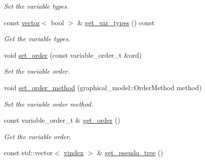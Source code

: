 \begin{DoxyCompactItemize}
\begin{DoxyCompactList}\small\item\em Set the variable types. \end{DoxyCompactList}\item 
const \hyperlink{classmerlin_1_1vector}{vector}$<$ bool $>$ \& \hyperlink{classmerlin_1_1wmb_a6bd57e3e3351407403d7cdf619ea286b}{get\+\_\+var\+\_\+types} () const \hypertarget{classmerlin_1_1wmb_a6bd57e3e3351407403d7cdf619ea286b}{}\label{classmerlin_1_1wmb_a6bd57e3e3351407403d7cdf619ea286b}

\begin{DoxyCompactList}\small\item\em Get the variable types. \end{DoxyCompactList}\item 
void \hyperlink{classmerlin_1_1wmb_aa16d549dcec0debda59998b3a8960212}{set\+\_\+order} (const variable\+\_\+order\+\_\+t \&ord)\hypertarget{classmerlin_1_1wmb_aa16d549dcec0debda59998b3a8960212}{}\label{classmerlin_1_1wmb_aa16d549dcec0debda59998b3a8960212}

\begin{DoxyCompactList}\small\item\em Set the variable order. \end{DoxyCompactList}\item 
void \hyperlink{classmerlin_1_1wmb_a4d6c6775868cac1a8559be5575d301f5}{set\+\_\+order\+\_\+method} (graphical\+\_\+model\+::\+Order\+Method method)\hypertarget{classmerlin_1_1wmb_a4d6c6775868cac1a8559be5575d301f5}{}\label{classmerlin_1_1wmb_a4d6c6775868cac1a8559be5575d301f5}

\begin{DoxyCompactList}\small\item\em Set the variable order method. \end{DoxyCompactList}\item 
const variable\+\_\+order\+\_\+t \& \hyperlink{classmerlin_1_1wmb_a2709605ec51725e4164d488bb71c81a7}{get\+\_\+order} ()\hypertarget{classmerlin_1_1wmb_a2709605ec51725e4164d488bb71c81a7}{}\label{classmerlin_1_1wmb_a2709605ec51725e4164d488bb71c81a7}

\begin{DoxyCompactList}\small\item\em Get the variable order. \end{DoxyCompactList}\item 
const std\+::vector$<$ \hyperlink{classmerlin_1_1wmb_ab942720d1c65e0002674af4eeade660f}{vindex} $>$ \& \hyperlink{classmerlin_1_1wmb_a23118e3df645be1029fa7642bf8fe090}{get\+\_\+pseudo\+\_\+tree} ()\hypertarget{classmerlin_1_1wmb_a23118e3df645be1029fa7642bf8fe090}{}\label{classmerlin_1_1wmb_a23118e3df645be1029fa7642bf8fe090}


\end{DoxyCompactItemize}
